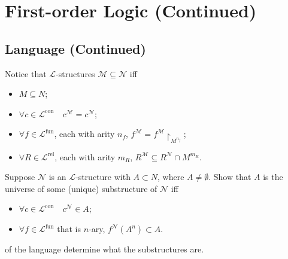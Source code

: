 \documentclass[notoc,notitlepage]{tufte-book}
\DeclareMathOperator{\con}{con}
\DeclareMathOperator{\fun}{fun}
\DeclareMathOperator{\rel}{rel}
\begin{document}
\section{First-order Logic (Continued)}%
\label{sec:first_order_logic_continued}

\subsection{Language (Continued)}%
\label{sub:language_continued}

\begin{note}\label{note:interpretations_in_substructs}
  Notice that $\mathcal{L}$-structures $\mathcal{M} \subseteq \mathcal{N}$ iff
  \begin{itemize}
    \item $M \subseteq N$;
    \item $\forall c \in \mathcal{L}^{\con} \quad c^\mathcal{M} = c^\mathcal{N}$;
    \item $\forall f \in \mathcal{L}^{\fun}$, each with arity $n_f$, $f^\mathcal{M} = f^\mathcal{M} \restriction_{M^{n_f}}$;
    \item $\forall R \in \mathcal{L}^{\rel}$, each with arity $m_R$, $R^\mathcal{M} \subseteq R^\mathcal{N} \cap M^{m_R}$.
  \end{itemize}
\end{note}

\begin{ex}
  Suppose $\mathcal{N}$ is an $\mathcal{L}$-structure with $A \subset N$, where $A \neq \emptyset$. Show that $A$ is the universe of some (unique) substructure of $\mathcal{N}$ iff
  \begin{itemize}
    \item $\forall c \in \mathcal{L}^{\con} \quad c^\mathcal{N} \in A$;
    \item $\forall f \in \mathcal{L}^{\fun}$ that is $n$-ary, $f^\mathcal{N}(A^n) \subset A$.
  \end{itemize}
\end{ex}

 of the language determine what the substructures are.
\end{document}

